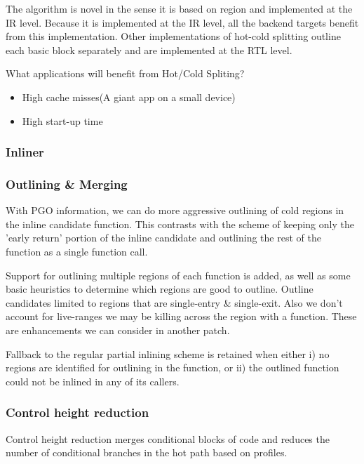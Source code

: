 The algorithm is novel in the sense it is based on region and implemented at the IR level. Because it is implemented at the IR level, all the backend targets benefit from this implementation. Other implementations of hot-cold splitting outline each basic block separately and are implemented at the RTL level.


What applications will benefit from Hot/Cold Spliting?

\begin{itemize}

\item High cache misses(A giant app on a small device)
\item High start-up time

\end{itemize}


\subsubsection{Inliner}



\subsubsection{Outlining \& Merging}

With PGO information, we can do more aggressive outlining of cold regions in the inline candidate function. This contrasts with the scheme of keeping only the 'early return' portion of the inline candidate and outlining the rest of the function as a single function call.

Support for outlining multiple regions of each function is added, as well as some basic heuristics to determine which regions are good to outline. Outline candidates limited to regions that are single-entry \& single-exit. Also we don't account for live-ranges we may be killing across the region with a function. These are enhancements we can consider in another patch.

Fallback to the regular partial inlining scheme is retained when either i) no regions are identified for outlining in the function, or ii) the outlined function could not be inlined in any of its callers.

\subsubsection{Control height reduction}

Control height reduction merges conditional blocks of code and reduces the
number of conditional branches in the hot path based on profiles.

